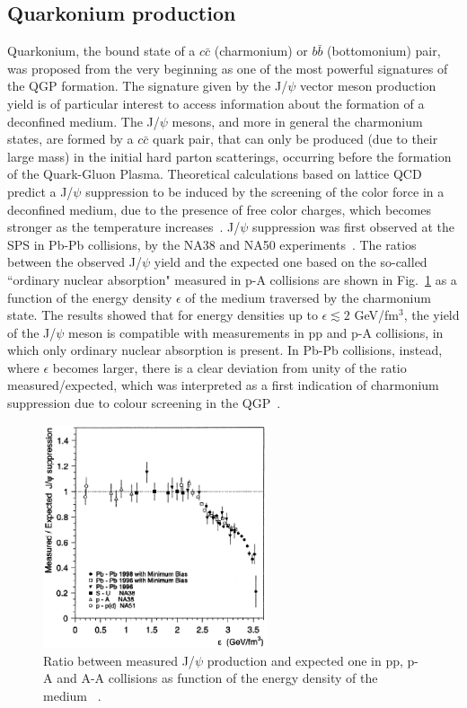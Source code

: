\subsection{Quarkonium production}
\label{sec:Quarkonium}
Quarkonium, the bound state of a $c\bar{c}$ (charmonium) or $b\bar{b}$ 
(bottomonium) pair, was proposed from the very beginning as one of the 
most powerful signatures of the QGP formation.
The signature given by the J/$\psi$ vector meson production yield is of particular interest
to access information about the formation of a deconfined medium.
The J/$\psi$ mesons, and more in general the charmonium states, are formed 
by a $c\bar{c}$ quark pair, that can only be produced (due to their large mass) 
in the initial hard parton scatterings, occurring before the formation of the 
Quark-Gluon Plasma. Theoretical calculations based on lattice QCD 
predict a J/$\psi$ suppression to be induced by the screening of the color 
force in a deconfined medium, due to the presence of free 
color charges, which becomes stronger as the temperature 
increases~\cite{Abreu:2000ni,Matsui:1986dk}. 
J/$\psi$ suppression was first observed at the SPS in Pb-Pb collisions, by 
the NA38 and NA50 experiments~\cite{Abreu:2000ni}.
The ratios between the observed J/$\psi$ yield and the expected one 
based on the so-called ``ordinary nuclear absorption" measured in p-A 
collisions are shown in Fig.~\ref{fig:JPsiSuppressionNA50} 
as a function of the energy density $\epsilon$ of the medium traversed by the charmonium state. 
The results showed that for energy densities up to $\epsilon \lesssim 2$ GeV/fm$^3$, 
the yield of the J/$\psi$ meson is compatible with measurements in pp 
and p-A collisions, in which only ordinary nuclear absorption is present. In Pb-Pb 
collisions, instead, where $\epsilon$ becomes larger, there is a clear deviation from 
unity of the ratio measured/expected, which was interpreted as a first indication of 
charmonium suppression due to colour screening in the QGP~\cite{Abreu:2000ni}.
\begin{figure}[!ht]
  \centering
  \includegraphics[width=6.6cm]{FigCap1/JPsiSuppressionNA50.eps}
  \caption{Ratio between measured J/$\psi$ production and expected one in pp, p-A and A-A collisions as function of the energy density of the medium ~\cite{Abreu:2000ni}.}
  \label{fig:JPsiSuppressionNA50}
\end{figure}
